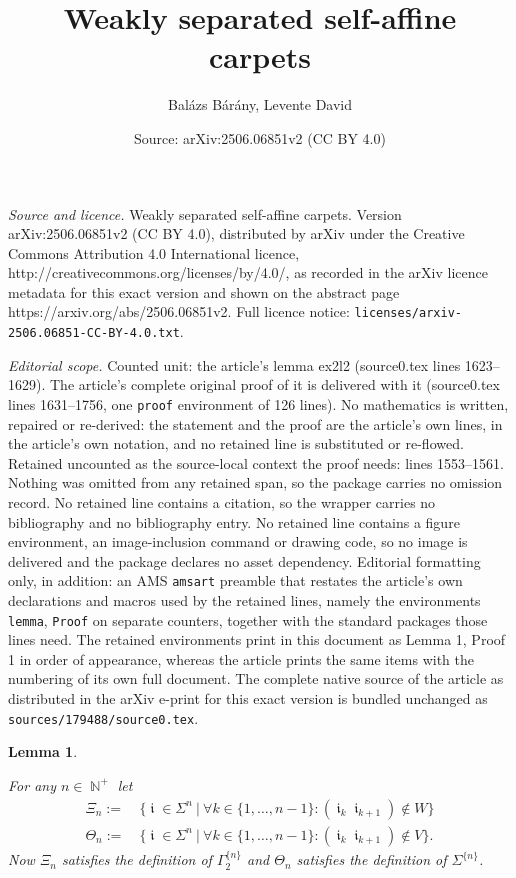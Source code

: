 \documentclass[10pt,a4paper]{amsart}
\title{Weakly separated self-affine carpets}
\author{Bal\'azs B\'ar\'any, Levente David}
\date{Source: arXiv:2506.06851v2 (CC BY 4.0)}
\newtheorem{lemma}{Lemma}
\DeclareMathOperator{\N}{\mathbb{N}}
\DeclareMathOperator{\iii}{\mathfrak{i}}
\begin{document}
\maketitle

\noindent\emph{Source and licence.} Weakly separated self-affine carpets. Version arXiv:2506.06851v2 (CC BY 4.0), distributed by arXiv under the Creative Commons Attribution 4.0 International licence, http://creativecommons.org/licenses/by/4.0/, as recorded in the arXiv licence metadata for this exact version and shown on the abstract page https://arxiv.org/abs/2506.06851v2. Full licence notice: \texttt{licenses/arxiv-2506.06851-CC-BY-4.0.txt}.\par\smallskip

\noindent\textit{Editorial scope.} Counted unit: the article's lemma ex2l2 (source0.tex lines 1623--1629). The article's complete original proof of it is delivered with it (source0.tex lines 1631--1756, one \texttt{proof} environment of 126 lines). No mathematics is written, repaired or re-derived: the statement and the proof are the article's own lines, in the article's own notation, and no retained line is substituted or re-flowed.  Retained uncounted as the source-local context the proof needs: lines 1553--1561.  Nothing was omitted from any retained span, so the package carries no omission record.  No retained line contains a citation, so the wrapper carries no bibliography and no bibliography entry.  No retained line contains a figure environment, an image-inclusion command or drawing code, so no image is delivered and the package declares no asset dependency.  Editorial formatting only, in addition: an AMS \texttt{amsart} preamble that restates the article's own declarations and macros used by the retained lines, namely the environments \texttt{lemma}, \texttt{Proof} on separate counters, together with the standard packages those lines need.  The retained environments print in this document as Lemma 1, Proof 1 in order of appearance, whereas the article prints the same items with the numbering of its own full document.  The complete native source of the article as distributed in the arXiv e-print for this exact version is bundled unchanged as \texttt{sources/179488/source0.tex}.
\begin{lemma} \label{ex2l1}

For any $n \in \N^+$ let 
\begin{align*}
\Xi_n :=&\ \Big\{ \iii \in \Sigma^n \ \Big| \ \forall k \in \{1,\dots,n-1\}: (\iii_k \iii_{k+1}) \notin W \Big\} \\
\Theta_n :=&\ \Big\{ \iii \in \Sigma^n \ \Big| \ \forall k \in \{1,\dots,n-1\}: (\iii_k \iii_{k+1}) \notin V \Big\}.
\end{align*}
Now $\Xi_n$ satisfies the definition of $\Gamma_2^{\{n\}}$ and $\Theta_n$ satisfies the definition of $\Sigma^{\{n\}}$.
\end{lemma}
\end{document}
